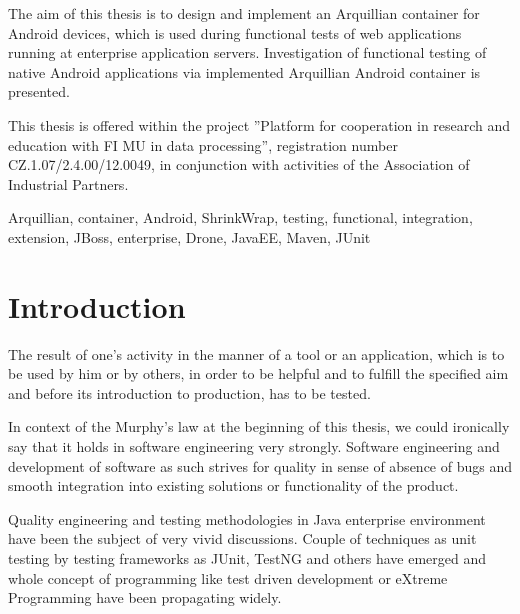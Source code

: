 \documentclass[12pt,final,oneside]{fithesis}
\begin{document}
\begin{ThesisAbstract}
The aim of this thesis is to design and implement an Arquillian container for Android devices, which is used during functional tests of web applications running at enterprise application servers. Investigation of functional testing of native Android applications via implemented Arquillian Android container is presented.

This thesis is offered within the project ''Platform for cooperation in research and education with FI
MU in data processing'', registration number CZ.1.07/2.4.00/12.0049, in conjunction with activities of
the Association of Industrial Partners.
\end{ThesisAbstract}

\begin{ThesisKeyWords}
Arquillian, container, Android, ShrinkWrap, testing, functional, integration, extension, JBoss, enterprise, Drone, JavaEE, Maven, JUnit
\end{ThesisKeyWords}

\clearpage
\thispagestyle{plain}
\par{}

\MainMatter
\tableofcontents

\chapter{Introduction}
The result of one's activity in the manner of a tool or an application, which is to be used by him or by others, in order to be helpful and to fulfill the specified aim and before its introduction to production, has to be tested.

In context of the Murphy's law at the beginning of this thesis, we could ironically say that it holds in software engineering very strongly. Software engineering and development of software as such strives for quality in sense of absence of bugs and smooth integration into existing solutions or functionality of the product.

Quality engineering and testing methodologies in Java enterprise environment have been the subject of very vivid discussions. Couple of techniques as unit testing by testing frameworks as JUnit, TestNG and others have emerged and whole concept of programming like test driven development or eXtreme Programming have been propagating widely. 
\end{document}
